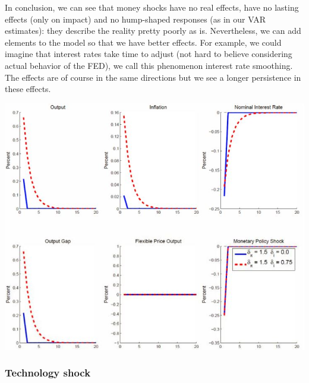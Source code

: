 \documentclass[12pt]{report}
\begin{document}
In conclusion, we can see that money shocks have no real effects, have no lasting effects (only on impact) and no hump-shaped responses (as in our VAR estimates): they describe the reality pretty poorly as is. Nevertheless, we can add elements to the model so that we have better effects. For example, we could imagine that interest rates take time to adjust (not hard to believe considering actual behavior of the FED), we call this phenomenon interest rate smoothing. The effects are of course in the same directions but we see a longer persistence in these effects.\begin{center}
\includegraphics[scale=0.5]{images/moneyshock3DNKi}
\end{center}

\subsubsection{Technology shock}
\end{document}
